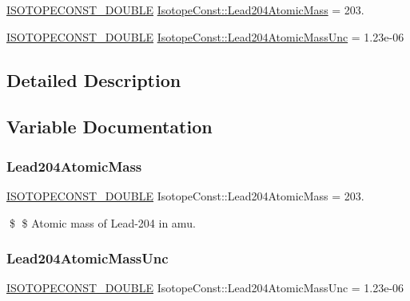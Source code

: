 \begin{DoxyCompactItemize}
\item 
\mbox{\hyperlink{group___isotope_const-_macros_ga8f45a7272ce02c0b4c65c44636ed719a}{I\+S\+O\+T\+O\+P\+E\+C\+O\+N\+S\+T\+\_\+\+D\+O\+U\+B\+LE}} \mbox{\hyperlink{group___isotope_const-_lead-_pb204_ga92e81c79a6c2c78bb9c79695f613e0ae}{Isotope\+Const\+::\+Lead204\+Atomic\+Mass}} = 203.
\item 
\mbox{\hyperlink{group___isotope_const-_macros_ga8f45a7272ce02c0b4c65c44636ed719a}{I\+S\+O\+T\+O\+P\+E\+C\+O\+N\+S\+T\+\_\+\+D\+O\+U\+B\+LE}} \mbox{\hyperlink{group___isotope_const-_lead-_pb204_gac498053adc49790902e5842720de05f9}{Isotope\+Const\+::\+Lead204\+Atomic\+Mass\+Unc}} = 1.\+23e-\/06
\end{DoxyCompactItemize}


\subsection{Detailed Description}


\subsection{Variable Documentation}
\mbox{\label{group___isotope_const-_lead-_pb204_ga92e81c79a6c2c78bb9c79695f613e0ae}} 
\subsubsection{\texorpdfstring{Lead204\+Atomic\+Mass}{Lead204AtomicMass}}
{\footnotesize\ttfamily \mbox{\hyperlink{group___isotope_const-_macros_ga8f45a7272ce02c0b4c65c44636ed719a}{I\+S\+O\+T\+O\+P\+E\+C\+O\+N\+S\+T\+\_\+\+D\+O\+U\+B\+LE}} Isotope\+Const\+::\+Lead204\+Atomic\+Mass = 203.}

\$ \$ Atomic mass of Lead-\/204 in amu. \mbox{\label{group___isotope_const-_lead-_pb204_gac498053adc49790902e5842720de05f9}} 
\subsubsection{\texorpdfstring{Lead204\+Atomic\+Mass\+Unc}{Lead204AtomicMassUnc}}
{\footnotesize\ttfamily \mbox{\hyperlink{group___isotope_const-_macros_ga8f45a7272ce02c0b4c65c44636ed719a}{I\+S\+O\+T\+O\+P\+E\+C\+O\+N\+S\+T\+\_\+\+D\+O\+U\+B\+LE}} Isotope\+Const\+::\+Lead204\+Atomic\+Mass\+Unc = 1.\+23e-\/06}

